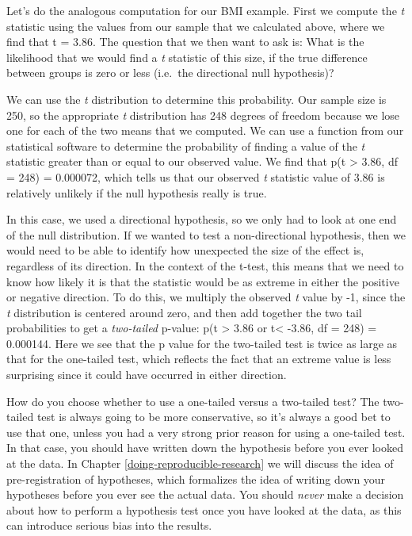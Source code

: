 \documentclass[12pt,]{book}
\theoremstyle{definition}
\theoremstyle{definition}
\theoremstyle{definition}
\theoremstyle{remark}
\begin{document}
Let's do the analogous computation for our BMI example. First we compute the \emph{t} statistic using the values from our sample that we calculated above, where we find that t = 3.86. The question that we then want to ask is: What is the likelihood that we would find a \emph{t} statistic of this size, if the true difference between groups is zero or less (i.e.~the directional null hypothesis)?

We can use the \emph{t} distribution to determine this probability. Our sample size is 250, so the appropriate \emph{t} distribution has 248 degrees of freedom because we lose one for each of the two means that we computed. We can use a function from our statistical software to determine the probability of finding a value of the \emph{t} statistic greater than or equal to our observed value. We find that p(t \textgreater{} 3.86, df = 248) = 0.000072, which tells us that our observed \emph{t} statistic value of 3.86 is relatively unlikely if the null hypothesis really is true.

In this case, we used a directional hypothesis, so we only had to look at one end of the null distribution. If we wanted to test a non-directional hypothesis, then we would need to be able to identify how unexpected the size of the effect is, regardless of its direction. In the context of the t-test, this means that we need to know how likely it is that the statistic would be as extreme in either the positive or negative direction. To do this, we multiply the observed \emph{t} value by -1, since the \emph{t} distribution is centered around zero, and then add together the two tail probabilities to get a \emph{two-tailed} p-value: p(t \textgreater{} 3.86 or t\textless{} -3.86, df = 248) = 0.000144. Here we see that the p value for the two-tailed test is twice as large as that for the one-tailed test, which reflects the fact that an extreme value is less surprising since it could have occurred in either direction.

How do you choose whether to use a one-tailed versus a two-tailed test? The two-tailed test is always going to be more conservative, so it's always a good bet to use that one, unless you had a very strong prior reason for using a one-tailed test. In that case, you should have written down the hypothesis before you ever looked at the data. In Chapter \ref{doing-reproducible-research} we will discuss the idea of pre-registration of hypotheses, which formalizes the idea of writing down your hypotheses before you ever see the actual data. You should \emph{never} make a decision about how to perform a hypothesis test once you have looked at the data, as this can introduce serious bias into the results.
\end{document}
